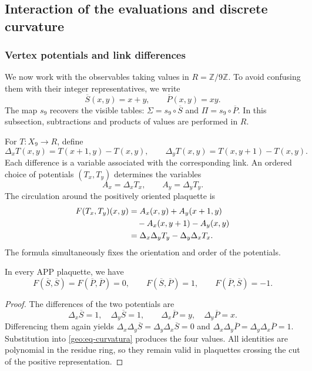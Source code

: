 \subsection{Interaction of the evaluations and discrete curvature}
\label{geo:curvatura}

\subsubsection{Vertex potentials and link differences}

We now work with the observables taking values in $R=\mathbb Z/9\mathbb Z$. To avoid confusing them with their integer representatives, we write
\[
 \overline S(x,y)=x+y,\qquad \overline P(x,y)=xy.
\]
The map $s_9$ recovers the visible tables: $\Sigma=s_9\circ\overline S$ and $\Pi=s_9\circ\overline P$. In this subsection, subtractions and products of values are performed in $R$.

For $T:X_9\to R$, define
\[
 \Delta_xT(x,y)=T(x+1,y)-T(x,y),\qquad
 \Delta_yT(x,y)=T(x,y+1)-T(x,y).
\]
Each difference is a variable associated with the corresponding link. An ordered choice of potentials $(T_x,T_y)$ determines the variables
\[
 A_x=\Delta_xT_x,\qquad A_y=\Delta_yT_y.
\]
The circulation around the positively oriented plaquette is
\begin{align}
 F(T_x,T_y)(x,y)
 &=A_x(x,y)+A_y(x+1,y)\notag\\
 &\quad-A_x(x,y+1)-A_y(x,y)\notag\\
 &=\Delta_x\Delta_yT_y-\Delta_y\Delta_xT_x.
 \label{geo:eq-curvatura}
\end{align}
The formula simultaneously fixes the orientation and order of the potentials.

\begin{proposicion}
\label{geo:prop-curvatura}
In every APP plaquette, we have
\[
 F(\overline S,\overline S)=F(\overline P,\overline P)=0,
 \qquad
 F(\overline S,\overline P)=1,
 \qquad F(\overline P,\overline S)=-1.
\]
\end{proposicion}

\begin{proof}
The differences of the two potentials are
\[
 \Delta_x\overline S=1,\quad\Delta_y\overline S=1,
 \qquad
 \Delta_x\overline P=y,\quad\Delta_y\overline P=x.
\]
Differencing them again yields $\Delta_x\Delta_y\overline S=\Delta_y\Delta_x\overline S=0$ and $\Delta_x\Delta_y\overline P=\Delta_y\Delta_x\overline P=1$. Substitution into \eqref{geo:eq-curvatura} produces the four values. All identities are polynomial in the residue ring, so they remain valid in plaquettes crossing the cut of the positive representation.
\end{proof}

